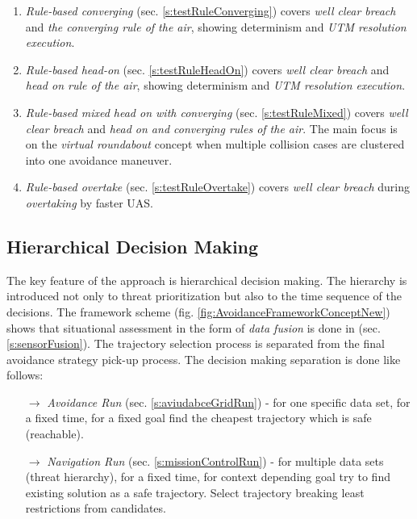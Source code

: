 \begin{enumerate}
    \item \emph{Rule-based converging} (sec. \ref{s:testRuleConverging}) covers \emph{well clear breach} and \emph{the converging rule of the air}, showing determinism and \emph{UTM resolution execution}.
    
    \item \emph{Rule-based head-on} (sec. \ref{s:testRuleHeadOn}) covers \emph{well clear breach} and \emph{head on rule of the air}, showing determinism and \emph{UTM resolution execution}.
    
    \item \emph{Rule-based mixed head on with converging} (sec. \ref{s:testRuleMixed}) covers \emph{well clear breach} and \emph{head on and converging rules of the air}. The main focus is on the \emph{virtual roundabout} concept when multiple collision cases are clustered into one avoidance maneuver. 
    
    \item \emph{Rule-based overtake} (sec. \ref{s:testRuleOvertake}) covers \emph{well clear breach} during \emph{overtaking} by faster UAS.
\end{enumerate}


\subsection{Hierarchical Decision Making}\label{s:conclusionAvoidanceNavigationRun}
\noindent The key feature of the approach is hierarchical decision making. The hierarchy is introduced not only to threat prioritization but also to the time sequence of the decisions. The framework scheme (fig. \ref{fig:AvoidanceFrameworkConceptNew}) shows that situational assessment in the form of \emph{data fusion} is done in (sec. \ref{s:sensorFusion}). The trajectory selection process is separated from the final avoidance strategy pick-up process. The decision making separation is done like follows:

\begin{itemize}
    \item[$\to$] \emph{Avoidance Run} (sec. \ref{s:aviudabceGridRun}) - for one specific data set, for a fixed time, for a fixed goal find the cheapest trajectory which is safe (reachable).
    
    \item[$\to$] \emph{Navigation Run} (sec. \ref{s:missionControlRun}) - for multiple data sets (threat hierarchy), for a fixed time, for context depending goal try to find existing solution as a safe trajectory. Select trajectory breaking least restrictions from candidates.
\end{itemize}

